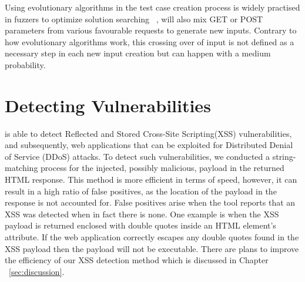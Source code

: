 Using evolutionary algorithms in the test case creation process is widely practised in fuzzers
to optimize solution searching ~\cite{seal2016Genetic}, \pname{} will also mix GET or POST parameters from various favourable requests to generate new inputs. Contrary to how evolutionary algorithms work, this crossing over of input is not defined as a necessary step in each new input creation but can happen with a medium probability.

\section{Detecting Vulnerabilities}
\pname{} is able to detect Reflected and Stored Cross-Site Scripting(XSS) vulnerabilities, and subsequently, web applications that can be exploited for Distributed Denial of Service (DDoS) attacks. To detect such vulnerabilities, we conducted a string-matching process for the injected, possibly malicious, payload in the returned HTML response. This method is more efficient in terms of speed, however, it can result in a high ratio of false positives, as the location of the payload in the response is not accounted for. False positives arise when the tool reports that an XSS was detected when in fact there is none. One example is when the XSS payload is returned enclosed with double quotes inside an HTML element's attribute. If the web application correctly escapes any double quotes found in the XSS payload then the payload will not be executable. There are plans to improve the efficiency of our XSS detection method which is discussed in Chapter ~\ref{sec:discussion}.
